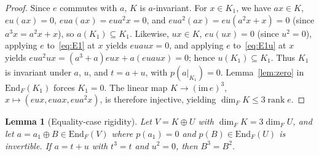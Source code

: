 \documentclass[11pt]{article}
\newtheorem{lemma}[theorem]{Lemma}
\begin{document}
\begin{proof}
Since $e$ commutes with $a$, $K$ is $a$-invariant. For $x \in K_1$, we have $ax \in K$, $eu(ax) = 0$, $eua(ax) = eua^2x = 0$, and $eua^2(ax) = eu(a^2x + x) = 0$ (since $a^3x = a^2x + x$), so $a(K_1) \subseteq K_1$. Likewise, $ux \in K$, $eu(ux) = 0$ (since $u^2 = 0$), applying $e$ to~\eqref{eq:E1} at $x$ yields $euaux = 0$, and applying $e$ to~\eqref{eq:E1u} at $x$ yields $eua^2ux = (a^3 + a)eux + a(euaux) = 0$; hence $u(K_1) \subseteq K_1$. Thus $K_1$ is invariant under $a$, $u$, and $t = a + u$, with $p(a|_{K_1}) = 0$. Lemma~\ref{lem:zero} in $\mathrm{End}_F(K_1)$ forces $K_1 = 0$. The linear map $K \to (\mathrm{im}\, e)^3$, $x \mapsto (eux, euax, eua^2x)$, is therefore injective, yielding $\dim_F K \le 3 \operatorname{rank} e$.
\end{proof}

\begin{lemma}[Equality-case rigidity]\label{lem:B}
Let $V = K \oplus U$ with $\dim_F K = 3 \dim_F U$, and let $a = a_1 \oplus B \in \mathrm{End}_F(V)$ where $p(a_1) = 0$ and $p(B) \in \mathrm{End}_F(U)$ is invertible. If $a = t + u$ with $t^3 = t$ and $u^2 = 0$, then $B^3 = B^2$.
\end{lemma}
\end{document}
